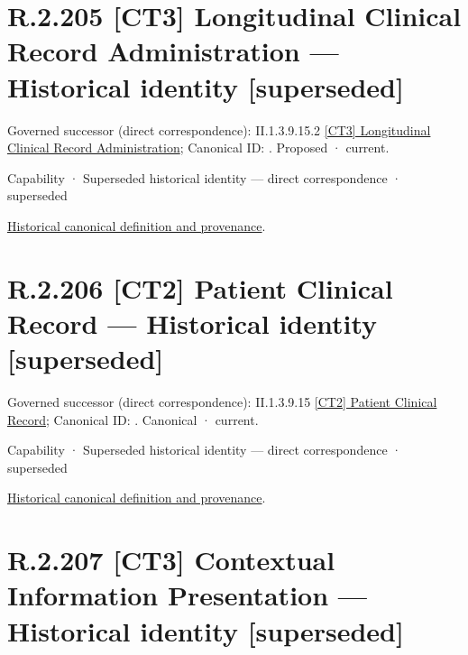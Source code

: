 \section*{R.2.205 [CT3] Longitudinal Clinical Record Administration — Historical identity [superseded]}
\label{navigation:R.2.205}

{\small Governed successor (direct correspondence): II.1.3.9.15.2 \hyperref[element:14748dc6117f4b6ba7c0fc554b76bd89]{[CT3] Longitudinal Clinical Record Administration}; Canonical ID: \texttt{}. Proposed · current.}\par
\label{element:bd91d848cf424c42bec7c80cd32edd28}
{\small Capability · Superseded historical identity — direct correspondence · superseded}\par
\href{../../../../continuum/strategy/capability/bd91d848cf424c42bec7c80cd32edd28.md}{Historical canonical definition and provenance}.\par
\section*{R.2.206 [CT2] Patient Clinical Record — Historical identity [superseded]}
\label{navigation:R.2.206}

{\small Governed successor (direct correspondence): II.1.3.9.15 \hyperref[element:5478878e0e6e4d34a8d5023ac6ac2d54]{[CT2] Patient Clinical Record}; Canonical ID: \texttt{}. Canonical · current.}\par
\label{element:2e4de521bda24ad7b0ea64ae535b7f84}
{\small Capability · Superseded historical identity — direct correspondence · superseded}\par
\href{../../../../continuum/strategy/capability/2e4de521bda24ad7b0ea64ae535b7f84.md}{Historical canonical definition and provenance}.\par
\section*{R.2.207 [CT3] Contextual Information Presentation — Historical identity [superseded]}
\label{navigation:R.2.207}

